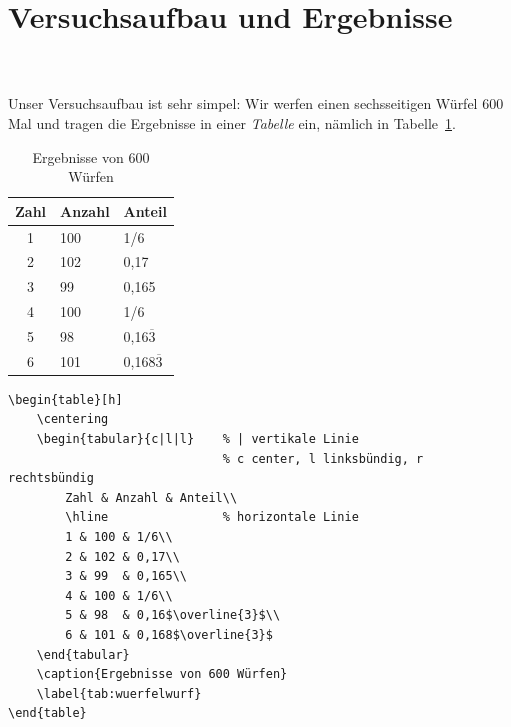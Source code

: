 \documentclass[12pt,a4paper]{scrartcl}
\begin{document}
\section{Versuchsaufbau und Ergebnisse}
\cprotect{}\\ \\
Unser Versuchsaufbau ist sehr simpel: Wir werfen einen sechsseitigen
Würfel 600 Mal und tragen die Ergebnisse in einer \textit{Tabelle} ein, nämlich in
Tabelle~\ref{tab:wuerfelwurf}.
\begin{table}[h]
    \centering
    \begin{tabular}{c|l|l}
        Zahl & Anzahl & Anteil\\
        \hline
        1 & 100 & 1/6\\
        2 & 102 & 0,17\\ 
        3 & 99 & 0,165\\
        4 & 100 & 1/6\\
        5 & 98 & 0,16$\overline{3}$\\
        6 & 101 & 0,168$\overline{3}$
    \end{tabular}
    \caption{Ergebnisse von 600 Würfen}
    \label{tab:wuerfelwurf}
\end{table}
\begin{Verbatim}[frame=single]
\begin{table}[h]
    \centering
    \begin{tabular}{c|l|l}    % | vertikale Linie
                              % c center, l linksbündig, r rechtsbündig
        Zahl & Anzahl & Anteil\\
        \hline                % horizontale Linie
        1 & 100 & 1/6\\
        2 & 102 & 0,17\\ 
        3 & 99  & 0,165\\
        4 & 100 & 1/6\\
        5 & 98  & 0,16$\overline{3}$\\
        6 & 101 & 0,168$\overline{3}$ 
    \end{tabular}
    \caption{Ergebnisse von 600 Würfen}
    \label{tab:wuerfelwurf}
\end{table}
\end{Verbatim}
\end{document}
